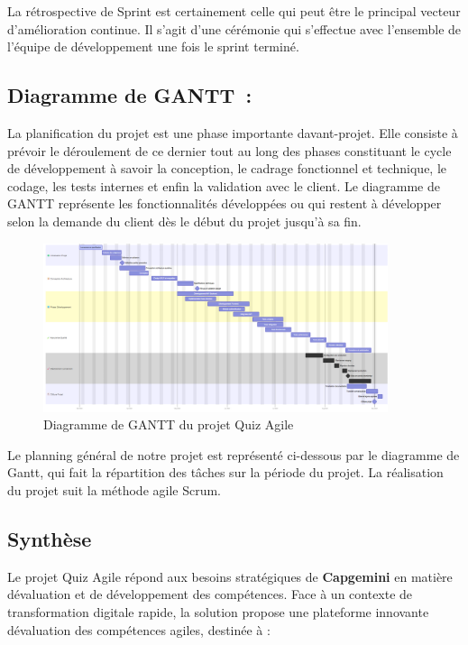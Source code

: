 \documentclass[12pt,a4paper,twoside,openright]{report}
\begin{document}
La rétrospective de Sprint est certainement celle qui peut être le
principal vecteur d'amélioration continue. Il s'agit d'une cérémonie qui
s'effectue avec l'ensemble de l'équipe de développement une fois le
sprint terminé.\,

\hypertarget{diagramme-de-gantt}{%
\subsection{Diagramme de GANTT~:}\label{diagramme-de-gantt}}

La planification du projet est une phase importante
d\textquotesingle avant-projet. Elle consiste à prévoir le déroulement
de ce dernier tout au long des phases constituant le cycle de
développement à savoir la conception, le cadrage fonctionnel et
technique, le codage, les tests internes et enfin la validation avec le
client. Le diagramme de GANTT représente les fonctionnalités développées
ou qui restent à développer selon la demande du client dès le début du
projet jusqu'à sa fin.

\begin{figure}[H]
\centering
\includegraphics[width=0.9\textwidth]{latex_media/media/image10.png}
\caption{Diagramme de GANTT du projet Quiz Agile}
\label{fig:gantt-quiz-agile}
\end{figure}

Le
planning général de notre projet est représenté ci-dessous par le
diagramme de Gantt, qui fait la répartition des tâches sur la période du
projet. La réalisation du projet suit la méthode agile Scrum.~

\hypertarget{synthese}{%
\subsection{Synthèse}\label{synthese}}

Le projet Quiz Agile répond aux besoins stratégiques de
\textbf{Capgemini} en matière d\textquotesingle évaluation et de
développement des compétences. Face à un contexte de transformation
digitale rapide, la solution propose une plateforme innovante
d\textquotesingle évaluation des compétences agiles, destinée à :
\end{document}
